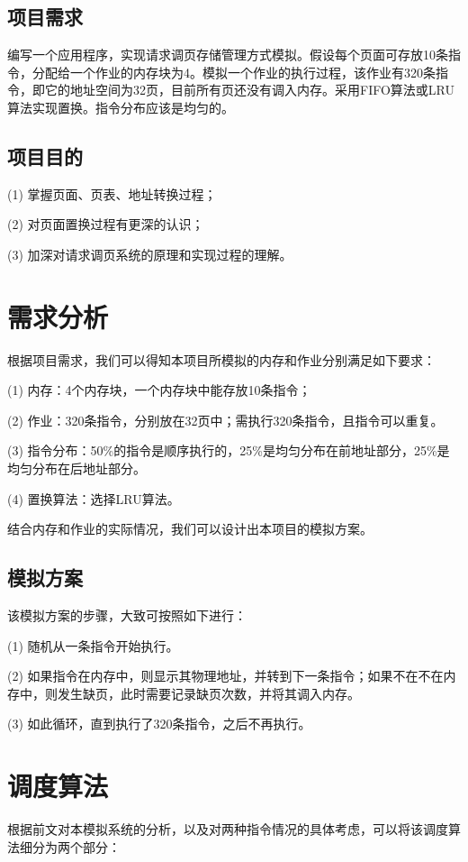 \documentclass{article}
\begin{document}
\begin{CJK}{UTF8}{gbsn}
\subsection{项目需求}
编写一个应用程序，实现请求调页存储管理方式模拟。假设每个页面可存放10条指令，分配给一个作业的内存块为4。模拟一个作业的执行过程，该作业有320条指令，即它的地址空间为32页，目前所有页还没有调入内存。采用FIFO算法或LRU算法实现置换。指令分布应该是均匀的。

\subsection{项目目的}
(1) 掌握页面、页表、地址转换过程；

(2) 对页面置换过程有更深的认识；

(3) 加深对请求调页系统的原理和实现过程的理解。


\vspace{4em}

\section{需求分析}
根据项目需求，我们可以得知本项目所模拟的内存和作业分别满足如下要求：

(1) 内存：4个内存块，一个内存块中能存放10条指令；

(2) 作业：320条指令，分别放在32页中；需执行320条指令，且指令可以重复。

(3) 指令分布：50\%的指令是顺序执行的，25\%是均匀分布在前地址部分，25\%是均匀分布在后地址部分。

(4) 置换算法：选择LRU算法。


结合内存和作业的实际情况，我们可以设计出本项目的模拟方案。

\subsection{模拟方案}
该模拟方案的步骤，大致可按照如下进行：

(1) 随机从一条指令开始执行。

(2) 如果指令在内存中，则显示其物理地址，并转到下一条指令；如果不在不在内存中，则发生缺页，此时需要记录缺页次数，并将其调入内存。

(3) 如此循环，直到执行了320条指令，之后不再执行。


\clearpage

\section{调度算法}
根据前文对本模拟系统的分析，以及对两种指令情况的具体考虑，可以将该调度算法细分为两个部分：


\end{CJK}
\end{document}
